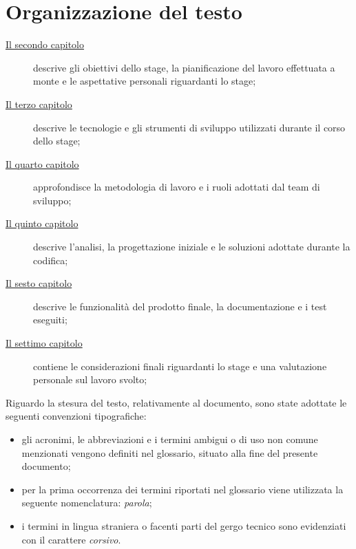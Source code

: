 \section{Organizzazione del testo}

\begin{description}
    \item[{\hyperref[cap:obiettivi-pianificazione]{Il secondo capitolo}}] descrive gli obiettivi dello stage, la pianificazione del lavoro effettuata a monte e le aspettative personali riguardanti lo stage;
    
    \item[{\hyperref[cap:tecnologie]{Il terzo capitolo}}] descrive le tecnologie e gli strumenti di sviluppo utilizzati durante il corso dello stage;
    
    \item[{\hyperref[cap:metodologia-lavoro]{Il quarto capitolo}}] approfondisce la metodologia di lavoro e i ruoli adottati dal team di sviluppo;
    
    \item[{\hyperref[cap:analisi]{Il quinto capitolo}}] descrive l'analisi, la progettazione iniziale e le soluzioni adottate durante la codifica;
    
    \item[{\hyperref[cap:prodotto]{Il sesto capitolo}}] descrive le funzionalità del prodotto finale, la documentazione e i test eseguiti;
    
    \item[{\hyperref[cap:considerazioni]{Il settimo capitolo}}] contiene le considerazioni finali riguardanti lo stage e una valutazione personale sul lavoro svolto;

\end{description}

Riguardo la stesura del testo, relativamente al documento, sono state adottate le seguenti convenzioni tipografiche:
\begin{itemize}
	\item gli acronimi, le abbreviazioni e i termini ambigui o di uso non comune menzionati vengono definiti nel glossario, situato alla fine del presente documento;
	\item per la prima occorrenza dei termini riportati nel glossario viene utilizzata la seguente nomenclatura: \emph{parola}\glsfirstoccur{};
	\item i termini in lingua straniera o facenti parti del gergo tecnico sono evidenziati con il carattere \emph{corsivo}.
\end{itemize}